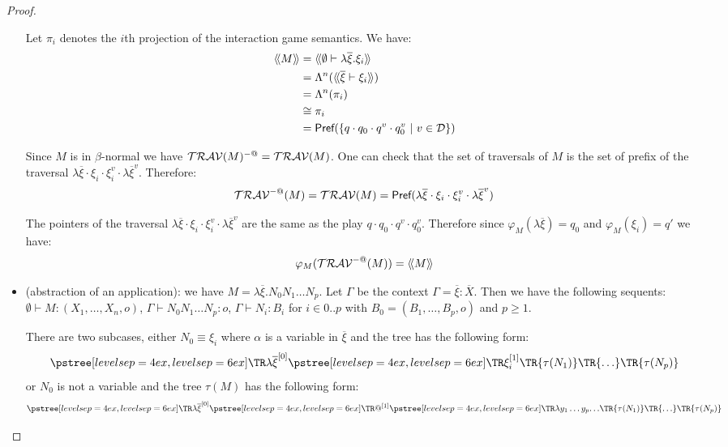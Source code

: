 \begin{proof}
\begin{itemize}
        Let $\pi_i$ denotes the $i$th projection of the interaction game
        semantics. We have:
        \begin{align*}
        {\langle\!\langle M \rangle\!\rangle} &= {\langle\!\langle \emptyset \vdash \lambda \overline{\xi} . \xi_i \rangle\!\rangle} \\
                     &= \Lambda^n({\langle\!\langle \overline{\xi} \vdash  \xi_i \rangle\!\rangle}) \\
                     &= \Lambda^n(\pi_i) \\
                     &\cong \pi_i \\
                     &= \textsf{Pref}(\{ q \cdot q_0 \cdot q^v \cdot q_0^v \ | \ v\in \mathcal{D} \})
        \end{align*}

        Since $M$ is in $\beta$-normal we have $\mathcal{TRAV}(M)^{-@} = \mathcal{TRAV}(M)$.
        One can check that the set of traversals of $M$ is the set of prefix of
        the traversal $\lambda \overline{\xi} \cdot \xi_i \cdot \xi_i^v \cdot \lambda
        \overline{\xi}^v$. Therefore:
        $$ \mathcal{TRAV}^{-@}(M) = \mathcal{TRAV}(M) = \textsf{Pref}( \lambda \overline{\xi} \cdot \xi_i \cdot \xi_i^v \cdot \lambda \overline{\xi}^v)
        $$

        The pointers of the traversal $\lambda \overline{\xi} \cdot \xi_i \cdot \xi_i^v \cdot \lambda
        \overline{\xi}^v$ are the same as the play $q \cdot q_0 \cdot q^v \cdot
        q_0^v$. Therefore since $\varphi_M(\lambda \overline{\xi}) = q_0$ and $\varphi_M(\xi_i) =
        q'$ we have:
        $$ \varphi_M(\mathcal{TRAV}^{-@}(M)) = {\langle\!\langle M \rangle\!\rangle}$$


    \item (abstraction of an application): we have $M = \lambda \overline{\xi} . N_0 N_1 \ldots N_p$. Let $\Gamma$ be the context
    $\Gamma = \overline{\xi} : \overline{X}$. Then we have the following sequents:
    $\emptyset \vdash M : (X_1,\ldots,X_n,o)$,
    $\Gamma \vdash N_0 N_1 \ldots N_p : o$,
    $\Gamma \vdash N_i : B_i$ for $i\in 0..p$ with $B_0 = (B_1,\ldots,B_p,o)$ and $p\geq 1$.

    There are two subcases, either $N_0 \equiv \xi_i$ where $\alpha$ is a variable in $\overline{\xi}$ and the tree has the following form:
    $$ \tree[levelsep=6ex]{\lambda \overline{\xi}^{[0]}}
        { \tree[levelsep=6ex]{\xi_i^{[1]}}
            {   \TR{\tau(N_1)} \TR{\ldots} \TR{\tau(N_p)}}}
    $$
    or $N_0$ is not a variable and the tree $\tau(M)$ has the following form:
    $$ \tree[levelsep=6ex]{\lambda \overline{\xi}^{[0]}}
        { \tree[levelsep=6ex]{@^{[1]}}
            {
            \tree[levelsep=6ex]{\lambda y_1 \ldots y_p}{\ldots}
            \TR{\tau(N_1)} \TR{\ldots} \TR{\tau(N_p)}}}
    $$


\end{itemize}
\end{proof}
